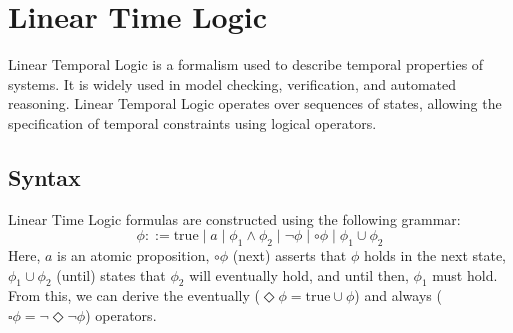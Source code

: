 \section{Linear Time Logic}

Linear Temporal Logic is a formalism used to describe temporal properties of systems. 
It is widely used in model checking, verification, and automated reasoning. 
Linear Temporal Logic operates over sequences of states, allowing the specification of temporal constraints using logical operators.

\subsection{Syntax}
Linear Time Logic formulas are constructed using the following grammar:
\[\phi::=\text{true}\mid a \mid \phi_1\land\phi_2\mid\lnot\phi\mid\circ \phi\mid\phi_1\cup\phi_2\]
\noindent Here, $a$ is an atomic proposition, $\circ\phi$ (next) asserts that $\phi$ holds in the next state, $\phi_1\cup\phi_2$ (until) states that $\phi_2$ will eventually hold, and until then, $\phi_1$ must hold.
From this, we can derive the eventually ($\Diamond\phi=\text{true}\cup\phi$) and always ($\square\phi=\lnot\Diamond\lnot\phi$) operators.

